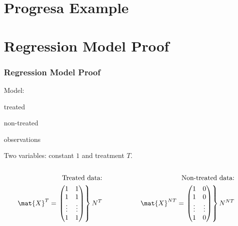 \documentclass[mathserif, xcolor=table, svgnames]{beamer}
\begin{document}
{

}

\section{Progresa Example}
\frame{\tableofcontents[currentsection]}

{

}

\section*{Regression Model Proof}


\begin{frame}
  \label{proof}
  \frametitle{Regression Model Proof}
  Model:
  \begin{description}
  \item[$N^T$] treated 
  \item[$N^{NT}$] non-treated
  \item[$N = N^{T} + N^{NT}$] observations
  \item Two variables: constant $1$ and treatment $T$.
  \end{description}
  \begin{columns}
    \begin{column}{0.49\linewidth}
      \begin{equation*}
        \begin{split}
          \text{Treated data:}
          \\
          \mat{X}^{T} = \left.
            \begin{pmatrix}
              1 & 1 \\ 1 & 1 \\ \vdots & \vdots \\ 1 & 1\\
            \end{pmatrix}
          \right\}
          N^{T}
        \end{split}
      \end{equation*}
    \end{column}
    \begin{column}{0.49\linewidth}
      \begin{equation*}
        \begin{split}
          \text{Non-treated data:}
          \\
          \mat{X}^{NT} = \left.
            \begin{pmatrix}
              1 & 0 \\ 1 & 0 \\ \vdots & \vdots \\ 1 & 0\\
            \end{pmatrix}
          \right\}
          N^{NT}
        \end{split}
      \end{equation*}
    \end{column}
  \end{columns}
\end{frame}
\end{document}
